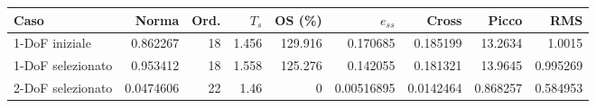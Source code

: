 \begin{tabular}{lrrrrrrrr}
\toprule
Caso & Norma & Ord. & $T_s$ & OS (\%) & $e_{ss}$ & Cross & Picco & RMS \\
\midrule
1-DoF iniziale & 0.862267 & 18 & 1.456 & 129.916 & 0.170685 & 0.185199 & 13.2634 & 1.0015 \\
1-DoF selezionato & 0.953412 & 18 & 1.558 & 125.276 & 0.142055 & 0.181321 & 13.9645 & 0.995269 \\
2-DoF selezionato & 0.0474606 & 22 & 1.46 & 0 & 0.00516895 & 0.0142464 & 0.868257 & 0.584953 \\
\bottomrule
\end{tabular}
